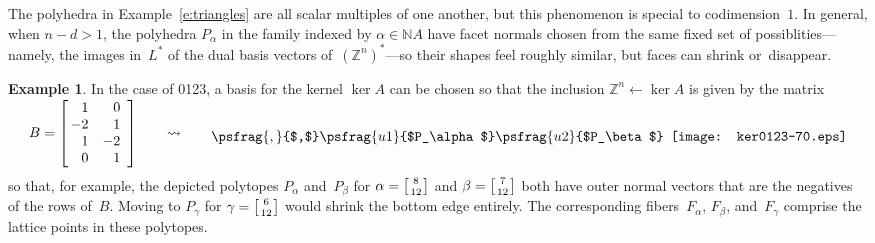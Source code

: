 \documentclass[12pt]{amsart}
\numberwithin{equation}{section}
\theoremstyle{definition}
\newtheorem{example}[thm]{Example}
\begin{document}
The polyhedra in Example~\ref{e:triangles} are all scalar multiples of
one another, but this phenomenon is special to codimension~$1$.  In
general, when \mbox{$n - d > 1$}, the polyhedra $P_\alpha$ in the
family indexed by $\alpha \in {\mathbb{N}} A$ have facet normals chosen from
the same fixed set of possiblities---namely, the images in~$L^*$ of
the dual basis vectors of~$({\mathbb{Z}}^n)^*$---so their shapes feel roughly
similar, but faces can shrink or~disappear.

\begin{example}
In the case of 0123, a basis for the kernel $\ker A$ can be chosen so
that the inclusion ${\mathbb{Z}}^n {\leftarrow} \ker A$ is given by the matrix
$$\begin{array}{cc}
  \begin{array}{c}
  \\[-4ex]
  B =
  \left[
  \begin{array}{@{\,}rr}
	 1 & 0 \\
	-2 & 1 \\
	 1 &-2 \\
	 0 & 1 
       \end{array}
  \right]
  \qquad{\rightsquigarrow}\ \
  \end{array}
&
  \psfrag{,}{$,$}
  \psfrag{u1}{$P_\alpha$}
  \psfrag{u2}{$P_\beta$}
  \begin{array}{c}\texttt{[image: ker0123-70.eps]}\end{array}
\end{array}
$$
so that, for example, the depicted polytopes $P_\alpha$ and~$P_\beta$
for $\alpha = \left[{{{\genfrac{}{}{0pt}{1}{{\scriptstyle {{8}}}}{{\scriptstyle {{12}}}}}}}\right]$
and $\beta = \left[{{{\genfrac{}{}{0pt}{1}{{\scriptstyle {{7}}}}{{\scriptstyle {{12}}}}}}}\right]$
both have outer normal vectors that are the negatives of the rows
of~$B$.  Moving to $P_\gamma$ for $\gamma =
\left[{{{\genfrac{}{}{0pt}{1}{{\scriptstyle {{6}}}}{{\scriptstyle {{12}}}}}}}\right]$ would shrink the bottom edge entirely.
The corresponding fibers~$F_\alpha$, $F_\beta$, and~$F_\gamma$
comprise the lattice points in these polytopes.
\end{example}
\end{document}
